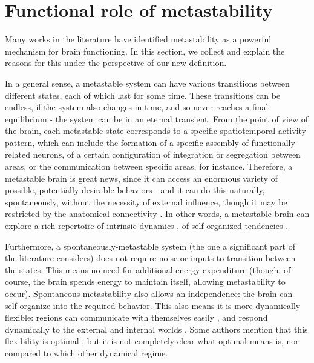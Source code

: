 \documentclass[preprint,superscriptaddress,showpacs,amsmath,amssymb,aps,pre,floatfix]{revtex4-1}
\theoremstyle{definition}
\begin{document}
\section{Functional role of metastability}
\label{sec:role}
Many works in the literature have identified metastability as a powerful mechanism for brain functioning. In this section, we collect and explain the reasons for this under the perspective of our new definition.

In a general sense, a metastable system can have various transitions between different states, each of which last for some time. These transitions can be endless, if the system also changes in time, and so never reaches a final equilibrium \cite{negrello_2008} - the system can be in an eternal transient. From the point of view of the brain, each metastable state corresponds to a specific spatiotemporal activity pattern, which can include the formation of a specific assembly of functionally-related neurons, of a certain configuration of integration or segregation between areas, or the communication between specific areas, for instance. 
Therefore, a metastable brain is great news, since it can access an enormous variety of possible, potentially-desirable behaviors - and it can do this naturally, spontaneously, without the necessity of external influence, though it may be restricted by the anatomical connectivity \cite{kringelbach_2015}. In other words, a metastable brain can explore a rich repertoire of intrinsic dynamics \cite{ponce-alvarez_2015, alderson_2020, hellyer_2014, kringelbach_2015}, of self-organized tendencies \cite{tognoli_2014}. 

Furthermore, a spontaneously-metastable system (the one a significant part of the literature considers) does not require noise or inputs to transition between the states. This means no need for additional energy expenditure \cite{tognoli_2014} (though, of course, the brain spends energy to maintain itself, allowing metastability to occur). Spontaneous metastability also allows an independence: the brain can self-organize into the required behavior. 
This also means it is more dynamically flexible: regions can communicate with themselves easily \cite{hellyer_2014, hellyer_2015}, and respond dynamically to the external and internal worlds \cite{ponce-alvarez_2015}. Some authors mention that this flexibility is optimal \cite{alderson_2020}, but it is not completely clear what optimal means is, nor compared to which other dynamical regime.
\end{document}
